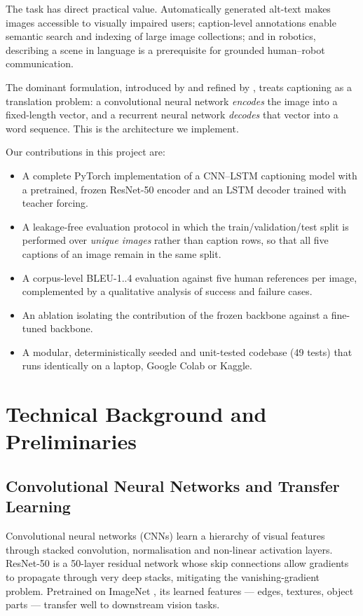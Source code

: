 \documentclass{article}
\begin{document}
The task has direct practical value. Automatically generated alt-text makes
images accessible to visually impaired users; caption-level annotations enable
semantic search and indexing of large image collections; and in robotics,
describing a scene in language is a prerequisite for grounded human--robot
communication.

The dominant formulation, introduced by \citet{vinyals2015show} and refined by
\citet{karpathy2015deep}, treats captioning as a translation problem: a
convolutional neural network \emph{encodes} the image into a fixed-length vector,
and a recurrent neural network \emph{decodes} that vector into a word sequence.
This is the architecture we implement.

Our contributions in this project are:
\begin{itemize}
  \item A complete PyTorch implementation of a CNN--LSTM captioning model with a
        pretrained, frozen ResNet-50 encoder and an LSTM decoder trained with
        teacher forcing.
  \item A leakage-free evaluation protocol in which the train/validation/test
        split is performed over \emph{unique images} rather than caption rows, so
        that all five captions of an image remain in the same split.
  \item A corpus-level BLEU-1..4 evaluation against five human references per
        image, complemented by a qualitative analysis of success and failure
        cases.
  \item An ablation isolating the contribution of the frozen backbone against a
        fine-tuned backbone.
  \item A modular, deterministically seeded and unit-tested codebase (49 tests)
        that runs identically on a laptop, Google Colab or Kaggle.
\end{itemize}

\section{Technical Background and Preliminaries}

\subsection{Convolutional Neural Networks and Transfer Learning}

Convolutional neural networks (CNNs) learn a hierarchy of visual features
through stacked convolution, normalisation and non-linear activation layers.
ResNet-50 \citep{he2016deep} is a 50-layer residual network whose skip
connections allow gradients to propagate through very deep stacks, mitigating the
vanishing-gradient problem. Pretrained on ImageNet \citep{deng2009imagenet}, its
learned features --- edges, textures, object parts --- transfer well to
downstream vision tasks.
\end{document}
